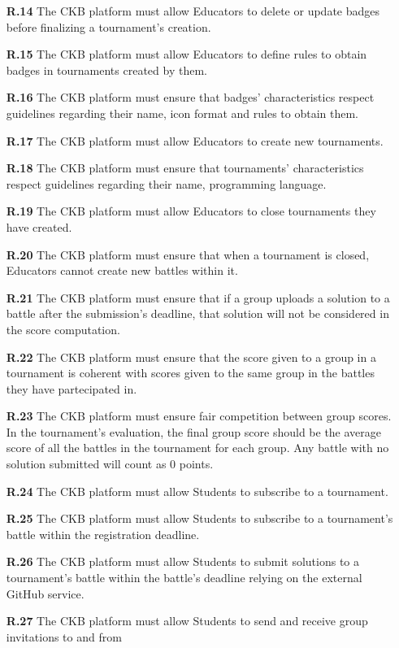 \documentclass{article}
\begin{document}
{\begin{itemize}
    \item[\textbf{R.14}] The CKB platform must allow Educators to delete or update badges before finalizing a tournament's creation.
    \item[\textbf{R.15}] The CKB platform must allow Educators to define rules to obtain badges in tournaments created by them.
    \item[\textbf{R.16}] The CKB platform must ensure that badges' characteristics respect guidelines regarding their
          name, icon format and rules to obtain them.
    \item[\textbf{R.17}] The CKB platform must allow Educators to create new tournaments.
    \item[\textbf{R.18}] The CKB platform must ensure that tournaments' characteristics respect guidelines regarding their
          name, programming language.
    \item[\textbf{R.19}] The CKB platform must allow Educators to close tournaments they have created.
    \item[\textbf{R.20}] The CKB platform must ensure that when a tournament is closed, Educators cannot create new battles
          within it.
    \item[\textbf{R.21}] The CKB platform must ensure that if a group uploads a solution to a battle after the submission's deadline,
          that solution will not be considered in the score computation.
    \item[\textbf{R.22}] The CKB platform must ensure that the score given to a group in a tournament is
          coherent with scores given to the same group in the battles they have partecipated in.
    \item[\textbf{R.23}] The CKB platform must ensure fair competition between group scores. In the tournament's evaluation, the final
          group score should be the average score of all the battles in the tournament for each group. Any battle with no solution submitted will count
          as 0 points.
    \item[\textbf{R.24}] The CKB platform must allow Students to subscribe to a tournament.
    \item[\textbf{R.25}] The CKB platform must allow Students to subscribe to a tournament's battle
          within the registration deadline.
    \item[\textbf{R.26}] The CKB platform must allow Students to submit solutions to a tournament's battle
          within the battle's deadline relying on the external GitHub service.
    \item[\textbf{R.27}] The CKB platform must allow Students to send and receive group invitations to and from

\end{itemize}}
\end{document}
